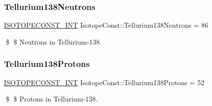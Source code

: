 \subsubsection{\texorpdfstring{Tellurium138\+Neutrons}{Tellurium138Neutrons}}
{\footnotesize\ttfamily \mbox{\hyperlink{group___isotope_const-_macros_ga5f18360b3e99483a35c32d789e62621c}{I\+S\+O\+T\+O\+P\+E\+C\+O\+N\+S\+T\+\_\+\+I\+NT}} Isotope\+Const\+::\+Tellurium138\+Neutrons = 86}

\$ \$ Neutrons in Tellurium-\/138. \mbox{\label{group___isotope_const-_tellurium-_te138_ga31e22837207eb301c43be073ffc0ce5f}} 
\subsubsection{\texorpdfstring{Tellurium138\+Protons}{Tellurium138Protons}}
{\footnotesize\ttfamily \mbox{\hyperlink{group___isotope_const-_macros_ga5f18360b3e99483a35c32d789e62621c}{I\+S\+O\+T\+O\+P\+E\+C\+O\+N\+S\+T\+\_\+\+I\+NT}} Isotope\+Const\+::\+Tellurium138\+Protons = 52}

\$ \$ Protons in Tellurium-\/138. 